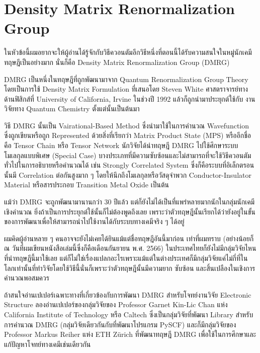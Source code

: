 \section{Density Matrix Renormalization Group}

ในหัวข้อนี้ผมอยากจะให้ผู้อ่านได้รู้จักกับวิธีควอนตัมอีกวิธีหนึ่งที่ตอนนี้ได้รับความสนใจในหมู่นักเคมีทฤษฎีเป็นอย่างมาก นั่นก็คือ Density Matrix
Renormalization Group (DMRG)

DMRG เป็นหนึ่งในทฤษฎีที่ถูกพัฒนามาจาก Quantum Renormalization Group Theory โดยเป็นการใช้ Density Matrix Formulation
ที่เสนอโดย Steven White ศาสตราจารย์ทางด้านฟิสิกส์ที่ University of California, Irvine ในช่วงปี 1992 แล้วก็ถูกนำมาประยุกต์ใช้กับ%
งานวิจัยทาง Quantum Chemistry ตั้งแต่นั้นเป็นต้นมา

วิธี DMRG นั้นเป็น Vairational-Based Method ซึ่งนำมาใช้ในการคำนวณ Wavefunction ซึ่งถูกเขียนหรือถูก Represented ด้วยสิ่งที่เรียกว่า
Matrix Product State (MPS) หรืออีกชื่อคือ Tensor Chain หรือ Tensor Network นักวิจัยได้นำทฤษฎี DMRG ไปใช้ศึกษาระบบโมเลกุลแบบพิเศษ
(Special Case) บางประเภทที่มีความซับซ้อนและไม่สามารถที่จะใช้วิธีควอนตัมทั่วไปในการอธิบายหรือคำนวณได้ เช่น Strongly Correlated
System ซึ่งก็คือระบบที่อิเล็กตรอนนั้นมี Correlation ต่อกันสูงมาก ๆ โดยให้นึกถึงโมเลกุลหรือวัสดุจำพวก Conductor-Insulator Material
หรือสารประกอบ Transition Metal Oxide เป็นต้น

แม้ว่า DMRG จะถูกพัฒนามานานกว่า 30 ปีแล้ว แต่ก็ยังไม่ได้เป็นที่แพร่หลายมากนักในกลุ่มนักเคมีเชิงคำนวณ ยิ่งถ้าเป็นการประยุกต์ใช้นั้นก็ไม่ต้องพูดถึงเลย
เพราะว่าตัวทฤษฎีนั้นเรียกได้ว่ายังอยู่ในขั้นของการพัฒนาเพื่อให้สามารถนำไปใช้งานได้กับระบบทางเคมีจริง ๆ ได้อยู่

ผมคิดผู้อ่านหลาย ๆ คนอาจจะยังไม่เคยได้ยินแม้แต่ชื่อทฤษฎีอันนี้มาก่อน เท่าที่ผมทราบ (อย่างน้อยก็ ณ วันที่ผมเขียนหนังสือเล่มนี้ซึ่งก็คือเดือนกันยายน
พ.ศ. 2566) ในประเทศไทยก็ยังไม่มีกลุ่มวิจัยไหนที่นำทฤษฎีนี้มาใช้เลย แต่ก็ไม่ใช่เรื่องแปลกอะไรเพราะแม้แต่ในต่างประเทศก็มีกลุ่มวิจัยแค่ไม่กี่ที่ใน%
โลกเท่านั้นที่ทำวิจัยโดยใช้วิธีนี้นั่นก็เพราะว่าตัวทฤษฎีนั้นมีความยาก ซับซ้อน และสิ้นเปลืองในเชิงการคำนวณพอสมควร

ถ้าสนใจอ่านเปเปอร์เฉพาะทางที่เกี่ยวข้องกับการพัฒนา DMRG สำหรับโจทย์งานวิจัย Electronic Structure ลองอ่านเปเปอร์ของกลุ่มวิจัยของ
Professor Garnet Kin-Lic Chan แห่ง California Institute of Technology หรือ Caltech ซึ่งเป็นกลุ่มวิจัยที่พัฒนา Library
สำหรับการคำนวณ DMRG (กลุ่มวิจัยเดียวกันกับที่พัฒนาโปรแกรม PySCF) และก็มีกลุ่มวิจัยของ Professor Markus Reiher แห่ง ETH Zürich
ที่พัฒนาทฤษฎี DMRG เพื่อใช้ในการศึกษาและแก้ปัญหาโจทย์ทางเคมีเช่นเดียวกัน

